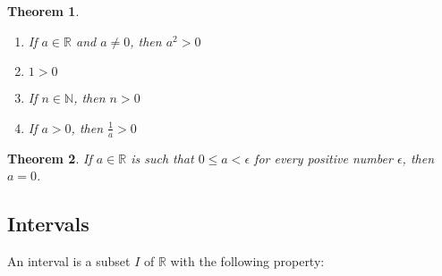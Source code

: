 \documentclass[8pt]{article}
\newtheorem{theorem}{Theorem}[section]
\theoremstyle{definition}
\begin{document}
\begin{theorem}
\hfill\\
\normalfont 
\begin{enumerate}[label=(\roman*)]
\item If $a\in\mathbb{R}$ and $a\neq 0$, then $a^2>0$
\item $1>0$
\item If $n\in\mathbb{N}$, then $n>0$
\item If $a>0$, then $\frac{1}{a}>0$
\end{enumerate}
\end{theorem}
\begin{theorem}
\normalfont If $a\in\mathbb{R}$ is such that $0\leq a<\epsilon$ for every positive number $\epsilon$, then $a=0$.
\end{theorem}
\subsection{Intervals}
An interval is a subset $I$ of $\mathbb{R}$ with the following property:
\begin{center}
\end{center}
\end{document}
